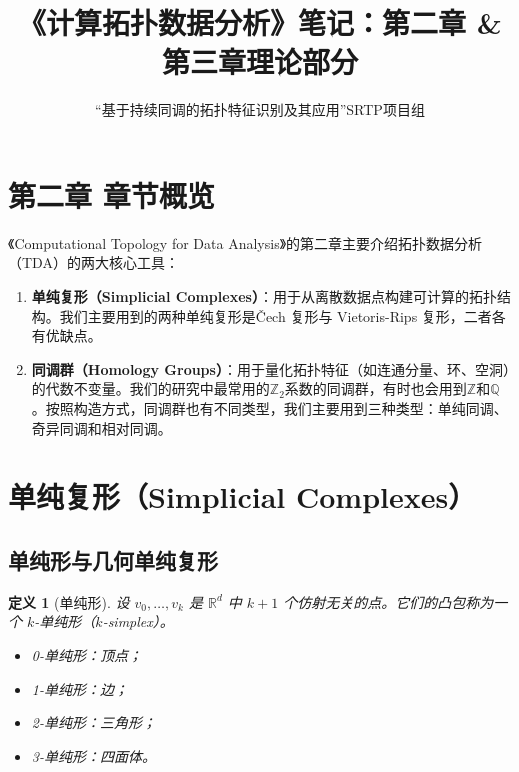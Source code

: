 \documentclass[UTF8]{ctexart}
\title{《计算拓扑数据分析》笔记：第二章 \& 第三章理论部分}
\author{“基于持续同调的拓扑特征识别及其应用”SRTP项目组}
\date{}
\newtheorem{definition}{定义}[section]
\begin{document}
\maketitle

\tableofcontents
\newpage


\section*{第二章 章节概览}

《Computational Topology for Data Analysis》的第二章主要介绍拓扑数据分析（TDA）的两大核心工具：
\begin{enumerate}
    \item \textbf{单纯复形（Simplicial Complexes）}：用于从离散数据点构建可计算的拓扑结构。我们主要用到的两种单纯复形是Čech 复形与 Vietoris-Rips 复形，二者各有优缺点。
    \item \textbf{同调群（Homology Groups）}：用于量化拓扑特征（如连通分量、环、空洞）的代数不变量。我们的研究中最常用的$\mathbb{Z}_{2}$系数的同调群，有时也会用到$\mathbb{Z}$和$\mathbb{Q}$。按照构造方式，同调群也有不同类型，我们主要用到三种类型：单纯同调、奇异同调和相对同调。
\end{enumerate}

\section{单纯复形（Simplicial Complexes）}
\label{sec:simplicial-complexes}

\subsection{单纯形与几何单纯复形}
\label{subsec:simplex}

\begin{definition}[单纯形]
\label{def:simplex}
设 \(v_0, \dots, v_k\) 是 \(\mathbb{R}^d\) 中 \(k+1\) 个仿射无关的点。它们的凸包称为一个 \(k\)-单纯形（\(k\)-simplex）。
\begin{itemize}
    \item 0-单纯形：顶点；
    \item 1-单纯形：边；
    \item 2-单纯形：三角形；
    \item 3-单纯形：四面体。
\end{itemize}
\end{definition}
\end{document}
